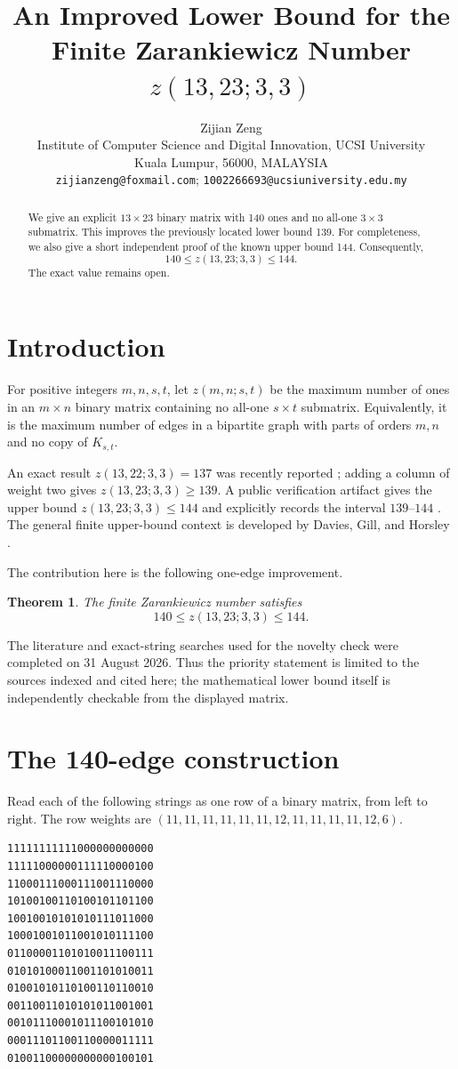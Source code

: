\documentclass[11pt]{article}
\title{An Improved Lower Bound for the Finite Zarankiewicz Number $z(13,23;3,3)$}
\author{Zijian Zeng\\
\small Institute of Computer Science and Digital Innovation, UCSI University\\
\small Kuala Lumpur, 56000, MALAYSIA\\
\small \texttt{zijianzeng@foxmail.com}; \texttt{1002266693@ucsiuniversity.edu.my}}
\date{}
\newtheorem{theorem}{Theorem}
\begin{document}
\maketitle

\begin{abstract}
We give an explicit $13\times23$ binary matrix with 140 ones and no all-one
$3\times3$ submatrix. This improves the previously located lower bound 139.
For completeness, we also give a short independent proof of the known upper
bound 144. Consequently,
\[
140\le z(13,23;3,3)\le144.
\]
The exact value remains open.
\end{abstract}

\section{Introduction}
For positive integers $m,n,s,t$, let $z(m,n;s,t)$ be the maximum number of
ones in an $m\times n$ binary matrix containing no all-one $s\times t$
submatrix. Equivalently, it is the maximum number of edges in a bipartite
graph with parts of orders $m,n$ and no copy of $K_{s,t}$.

An exact result $z(13,22;3,3)=137$ was recently reported
\cite{afrasyab2026}; adding a column of weight two gives
$z(13,23;3,3)\ge139$. A public verification artifact gives the upper bound
$z(13,23;3,3)\le144$ and explicitly records the interval $139$--$144$
\cite{FiniteZarankiewiczClosures2026}. The general finite upper-bound context is developed by
Davies, Gill, and Horsley \cite{davies2026}.

The contribution here is the following one-edge improvement.

\begin{theorem}\label{thm:interval}
The finite Zarankiewicz number satisfies
\[
140\le z(13,23;3,3)\le144.
\]
\end{theorem}

The literature and exact-string searches used for the novelty check were
completed on 31 August 2026. Thus the priority statement is limited to the
sources indexed and cited here; the mathematical lower bound itself is
independently checkable from the displayed matrix.

\section{The 140-edge construction}
Read each of the following strings as one row of a binary matrix, from left to
right. The row weights are
$(11,11,11,11,11,11,12,11,11,11,11,12,6)$.
\begin{center}
\begin{verbatim}
11111111111000000000000
11111000000111110000100
11000111000111001110000
10100100110100101101100
10010010101010111011000
10001001011001010111100
01100001101010011100111
01010100011001101010011
01001010110100110110010
00110011010101011001001
00101110001011100101010
00011101100110000011111
01001100000000000100101
\end{verbatim}
\end{center}
\end{document}
